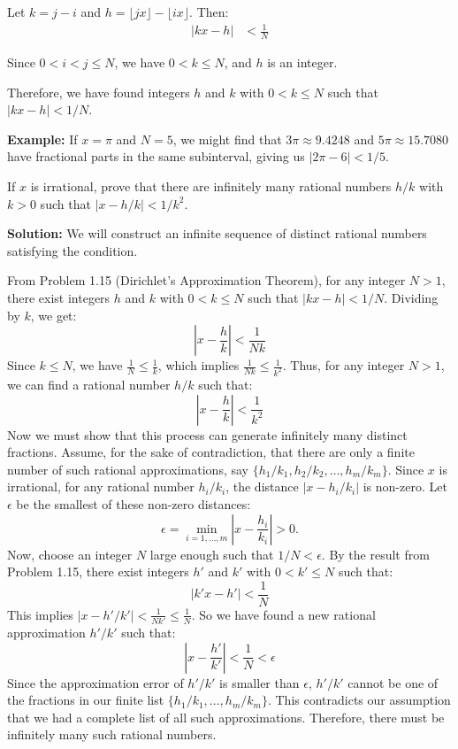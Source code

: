 Let $k = j - i$ and $h = \lfloor jx \rfloor - \lfloor ix \rfloor$. Then:
\begin{align*}
|kx - h| &< \frac{1}{N}
\end{align*}

Since $0 < i < j \leq N$, we have $0 < k \leq N$, and $h$ is an integer.

Therefore, we have found integers $h$ and $k$ with $0 < k \leq N$ such that $|kx - h| < 1/N$.

\textbf{Example:}
If $x = \pi$ and $N = 5$, we might find that $3\pi \approx 9.4248$ and $5\pi \approx 15.7080$ have fractional parts in the same subinterval, giving us $|2\pi - 6| < 1/5$.

\begin{problembox}
If $x$ is irrational, prove that there are infinitely many rational numbers $h/k$ with $k > 0$ such that $|x - h/k| < 1/k^2$.
\end{problembox}
\textbf{Solution:}
We will construct an infinite sequence of distinct rational numbers satisfying the condition.

From Problem 1.15 (Dirichlet's Approximation Theorem), for any integer $N > 1$, there exist integers $h$ and $k$ with $0 < k \leq N$ such that $|kx - h| < 1/N$.
Dividing by $k$, we get:
\[
\left|x - \frac{h}{k}\right| < \frac{1}{Nk}
\]
Since $k \leq N$, we have $\frac{1}{N} \leq \frac{1}{k}$, which implies $\frac{1}{Nk} \leq \frac{1}{k^2}$.
Thus, for any integer $N>1$, we can find a rational number $h/k$ such that:
\[
\left|x - \frac{h}{k}\right| < \frac{1}{k^2}
\]
Now we must show that this process can generate infinitely many distinct fractions.
Assume, for the sake of contradiction, that there are only a finite number of such rational approximations, say $\{h_1/k_1, h_2/k_2, \ldots, h_m/k_m\}$.
Since $x$ is irrational, for any rational number $h_i/k_i$, the distance $|x - h_i/k_i|$ is non-zero. Let $\epsilon$ be the smallest of these non-zero distances:
\[
\epsilon = \min_{i=1,\dots,m} \left|x - \frac{h_i}{k_i}\right| > 0.
\]
Now, choose an integer $N$ large enough such that $1/N < \epsilon$.
By the result from Problem 1.15, there exist integers $h'$ and $k'$ with $0 < k' \leq N$ such that:
\[
|k'x - h'| < \frac{1}{N}
\]
This implies $|x - h'/k'| < \frac{1}{Nk'} \leq \frac{1}{N}$.
So we have found a new rational approximation $h'/k'$ such that:
\[
\left|x - \frac{h'}{k'}\right| < \frac{1}{N} < \epsilon
\]
Since the approximation error of $h'/k'$ is smaller than $\epsilon$, $h'/k'$ cannot be one of the fractions in our finite list $\{h_1/k_1, \ldots, h_m/k_m\}$. This contradicts our assumption that we had a complete list of all such approximations.
Therefore, there must be infinitely many such rational numbers.


